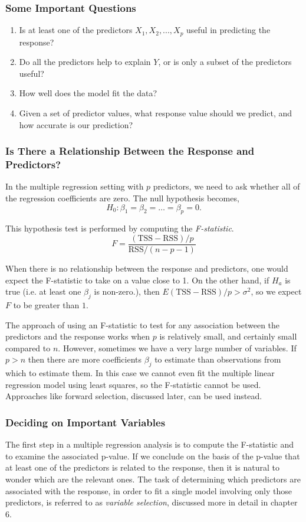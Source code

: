 \documentclass{article}
\begin{document}
\subsubsection{Some Important Questions}
\begin{enumerate}
    \item Is at least one of the predictors $X_1, X_2,...,X_p$ useful in predicting the response?
    \item Do all the predictors help to explain $Y$, or is only a subset of the predictors useful?
    \item How well does the model fit the data? 
    \item Given a set of predictor values, what response value should we predict, and how accurate is our prediction?
\end{enumerate}

\subsubsection*{Is There a Relationship Between the Response and Predictors?}
In the multiple regression setting with $p$ predictors, we need to ask whether all of the regression coefficients are zero. The null hypothesis becomes,
\[
    H_0 : \beta_1 = \beta_2 = \dots = \beta_p = 0.
\]

This hypothesis test is performed by computing the \textit{F-statistic}.
\[
    F = \frac{(\text{TSS} - \text{RSS})/p }{\text{RSS}/ (n-p-1)}
\]

When there is no relationship between the response and predictors, one would expect the F-statistic to take on a value close to 1. On the other hand, if $H_a$ is true (i.e. at least one $\beta_j$ is non-zero.), then $E{(\text{TSS} - \text{RSS})/p} > \sigma^2$, so we expect $F$ to be greater than $1$.

The approach of using an F-statistic to test for any association between the predictors and the response works when $p$ is relatively small, and certainly small compared to $n$. However, sometimes we have a very large number of variables. If $p>n$ then there are more coefficients $\beta_j$ to estimate than observations from which to estimate them. In this case we cannot even fit the multiple linear regression model using least squares, so the F-statistic cannot be used. Approaches like forward selection, discussed later, can be used instead.

\subsubsection{Deciding on Important Variables}
The first step in a multiple regression analysis is to compute the F-statistic and to examine the associated p-value. If we conclude on the basis of the p-value that at least one of the predictors is related to the response, then it is natural to wonder which are the relevant ones. The task of determining which predictors are associated with the response, in order to fit a single model involving only those predictors, is referred to as \textit{variable selection}, discussed more in detail in chapter 6.
\end{document}
